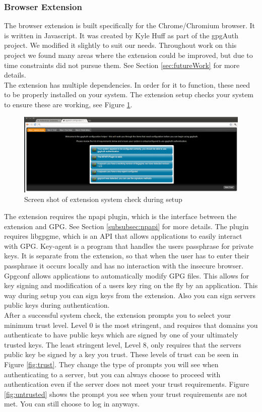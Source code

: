 \documentclass[11pt]{article}
\begin{document}
\subsubsection{Browser Extension}
The browser extension is built specifically for the Chrome/Chromium browser. It is written in Javascript. It was created by Kyle Huff as part of the gpgAuth project. We modified it slightly to suit our needs. Throughout work on this project we found many areas where the extension could be improved, but due to time constraints did not pursue them. See Section \ref{sec:futureWork} for more details.\\
The extension has multiple dependencies. In order for it to function, these need to be properly installed on your system. The extension setup checks your system to ensure these are working, see Figure \ref{fig:ext_setup_check}.\\
\begin{figure}[h!]
\centering
\includegraphics[scale=0.3]{ext_setup_systemCheck}
\caption{Screen shot of extension system check during setup}
\label{fig:ext_setup_check}
\end{figure}

The extension requires the npapi plugin, which is the interface between the extension and GPG. See Section \ref{subsubsec:npapi} for more details. The plugin requires libgpgme, which is an API that allows applications to easily interact with GPG. Key-agent is a program that handles the users passphrase for private keys. It is separate from the extension, so that when the user has to enter their passphrase it occurs locally and has no interaction with the insecure browser. Gpgconf allows applications to automatically modify GPG files. This allows for key signing and modification of a users key ring on the fly by an application. This way during setup you can sign keys from the extension. Also you can sign servers public keys during authentication.\\
After a successful system check, the extension prompts you to select your minimum trust level. Level 0 is the most stringent, and requires that domains you authenticate to have public keys which are signed by one of your ultimately trusted keys. The least stringent level, Level 8, only requires that the servers public key be signed by a key you trust. These levels of trust can be seen in Figure \ref{fig:trust}. They change the type of prompts you will see when authenticating to a server, but you can always choose to proceed with authentication even if the server does not meet your trust requirements. Figure \ref{fig:untrusted} shows the prompt you see when your trust requirements are not met. You can still choose to log in anyways.\\
\end{document}

